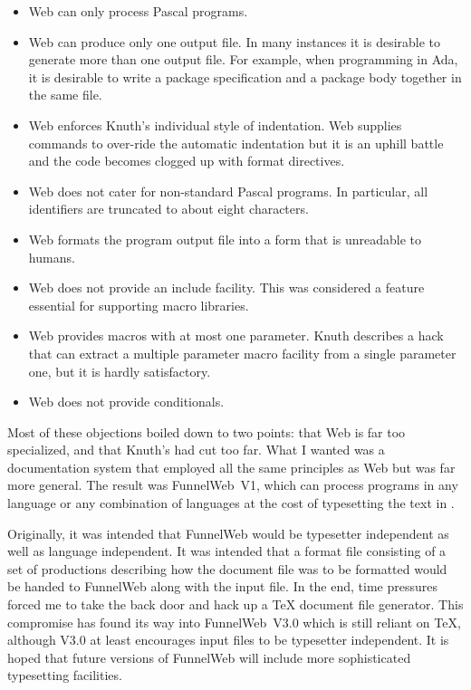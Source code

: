 \begin{itemize}

\item Web can only process Pascal programs.

\item Web can produce only one output file. In many instances it is
desirable to generate  more than one output file. For  example, when programming
in Ada,  it is  desirable to write  a package specification  and a  package body
together in the same file.

\item  Web  enforces  Knuth's  individual style  of  indentation.  Web  supplies
commands to over-ride  the automatic indentation but it is  an uphill battle and
the code becomes clogged up with format directives.

\item Web  does not cater for  non-standard Pascal programs. In  particular, all
identifiers are truncated to about eight characters.

\item Web  formats the  program output file  into a form  that is  unreadable to
humans.

\item  Web does  not  provide an include facility.
This  was considered a feature essential for supporting macro libraries.

\item Web provides macros with at most one parameter. Knuth
describes a hack that can
extract a multiple parameter macro facility  from a single parameter one,
but it is hardly satisfactory.

\item Web does not provide conditionals.

\end{itemize}

Most  of these  objections boiled  down  to two points:
that Web  is far  too
specialized, and that Knuth's 
had cut too far.
What I wanted was
a documentation system that employed  all the same principles as Web
but was far
more  general. The  result  was FunnelWeb~V1,  which can
process  programs in  any
language or any combination of languages at  the cost of typesetting the text in
.

Originally, it  was intended that  FunnelWeb would be typesetter  independent as
well as language independent. It was intended that a format file consisting of a
set of productions describing how the document file was to be formatted would be
handed to FunnelWeb along with the input file. In the end, time pressures forced
me to take the back door and hack up a \TeX{} document file generator. This
compromise has found its way into FunnelWeb~V3.0 which is still reliant
on \TeX{}, although V3.0 at least encourages input files to be typesetter
independent. It is hoped that future versions of FunnelWeb will include
more sophisticated typesetting facilities.

